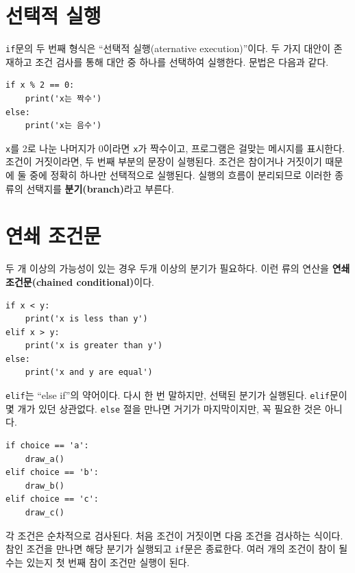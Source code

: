 \documentclass[10pt]{book}
\begin{document}
\section{선택적 실행}
\label{alternative.execution}

{\tt if}문의 두 번째 형식은 ``선택적 실행(aternative
execution)''이다.  두 가지 대안이 존재하고 조건 검사를 통해 대안 중
하나를 선택하여 실행한다.  문법은 다음과 같다.

\begin{verbatim}
if x % 2 == 0:
    print('x는 짝수')
else:
    print('x는 음수')
\end{verbatim}
%
{\tt x}를 2로 나눈 나머지가 0이라면 {\tt x}가 짝수이고, 프로그램은
걸맞는 메시지를 표시한다.  조건이 거짓이라면, 두 번째 부분의 문장이
실행된다.  조건은 참이거나 거짓이기 때문에 둘 중에 정확히 하나만
선택적으로 실행된다.  실행의 흐름이 분리되므로 이러한 종류의 선택지를
{\bf 분기(branch)}라고 부른다.  



\section{연쇄 조건문}

두 개 이상의 가능성이 있는 경우 두개 이상의 분기가 필요하다.  이런 류의
연산을 {\bf 연쇄 조건문(chained conditional)}이다.


\begin{verbatim}
if x < y:
    print('x is less than y')
elif x > y:
    print('x is greater than y')
else:
    print('x and y are equal')
\end{verbatim}
%
{\tt elif}는 ``else if''의 약어이다.  다시 한 번 말하지만, 선택된
분기가 실행된다.  {\tt elif}문이 몇 개가 있던 상관없다.  {\tt else}
절을 만나면 거기가 마지막이지만, 꼭 필요한 것은 아니다.

\begin{verbatim}
if choice == 'a':
    draw_a()
elif choice == 'b':
    draw_b()
elif choice == 'c':
    draw_c()
\end{verbatim}
%
각 조건은 순차적으로 검사된다.  처음 조건이 거짓이면 다음 조건을
검사하는 식이다.  참인 조건을 만나면 해당 분기가 실행되고 {\tt if}문은
종료한다.  여러 개의 조건이 참이 될 수는 있는지 첫 번째 참이 조건만
실행이 된다.
\end{document}
